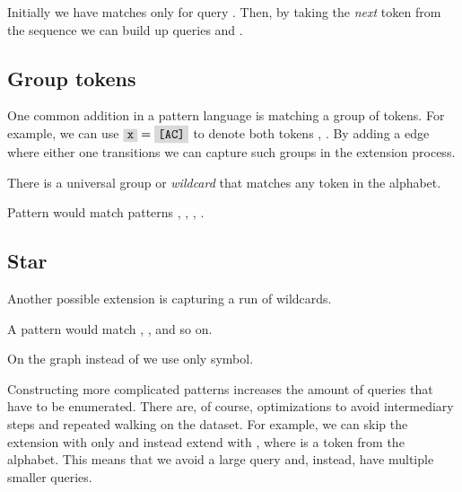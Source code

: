 \begin{figure}[H]
	
\end{figure}

Initially we have matches only for query . Then, by taking the \emph{next} token from the sequence we can build up queries  and .

\subsection{Group tokens}

One common addition in a pattern language is matching a group of tokens. For example, we can use $\R{x} = \R{[AC]}$ to denote both tokens , . By adding a edge where either one transitions we can capture such groups in the extension process.

\begin{figure}[H]
	
\end{figure}

There is a universal group  or \emph{wildcard} that matches any token in the alphabet.

\begin{exmp}
Pattern  would match patterns , , , .
\end{exmp}

\subsection{Star}

Another possible extension is capturing a run of wildcards.

\begin{exmp}
A pattern  would match , ,  and so on.
\end{exmp}

On the graph instead of  we use only \R{*} symbol.

\begin{figure}[H]
	
\end{figure}

Constructing more complicated patterns increases the amount of queries that have to be enumerated. There are, of course, optimizations to avoid intermediary steps and repeated walking on the dataset. For example, we can skip the extension with only  and instead extend with , where  is a token from the alphabet. This means that we avoid a large query and, instead, have multiple smaller queries.

